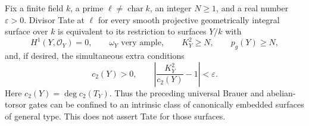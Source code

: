 \begin{corollary}
\label{cor:B-canonical-surface-gate}
Fix a finite field \(k\), a prime \(\ell\ne\operatorname{char}k\),
an integer \(N\ge1\), and a real number \(\varepsilon>0\).
Divisor Tate at \(\ell\) for every smooth projective geometrically
integral surface over \(k\) is equivalent to its restriction to
surfaces \(Y/k\) with
\[
 H^1(Y,\mathcal O_Y)=0,\qquad \omega_Y\text{ very ample},
 \qquad K_Y^2\ge N,\qquad p_g(Y)\ge N,
\]
and, if desired, the simultaneous extra conditions
\[
             c_2(Y)>0,\qquad
             \left|\frac{K_Y^2}{c_2(Y)}-1\right|<\varepsilon.
\]
Here \(c_2(Y)=\deg c_2(T_Y)\).
Thus the preceding universal Brauer and abelian-torsor gates can
be confined to an intrinsic class of canonically embedded surfaces
of general type.  This does not assert Tate for those surfaces.
\end{corollary}
